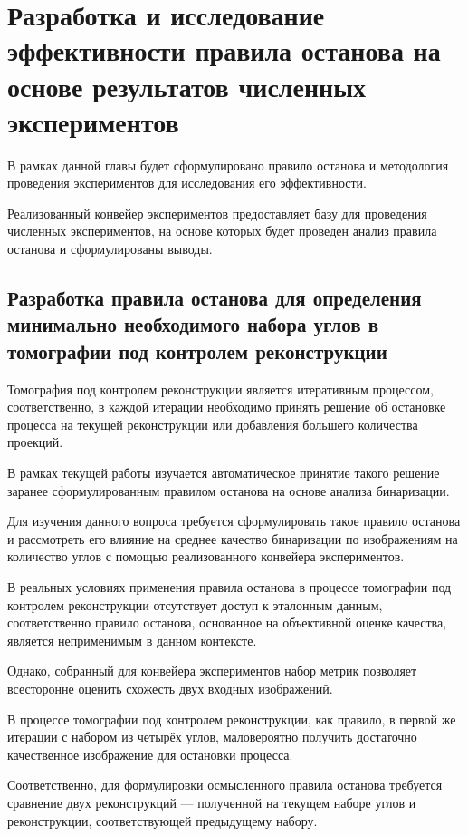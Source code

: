\section{Разработка и исследование эффективности правила останова на основе результатов численных экспериментов}

В рамках данной главы будет сформулировано правило останова и методология проведения экспериментов для исследования его эффективности.

Реализованный конвейер экспериментов предоставляет базу для проведения численных экспериментов, на основе которых будет проведен анализ правила останова и сформулированы выводы.

\subsection{Разработка правила останова для определения минимально необходимого набора углов в томографии под контролем реконструкции}

Томография под контролем реконструкции является итеративным процессом, соответственно, в каждой итерации необходимо принять решение об остановке процесса на текущей реконструкции или добавления большего количества проекций.

В рамках текущей работы изучается автоматическое принятие такого решение заранее сформулированным правилом останова на основе анализа бинаризации.

Для изучения данного вопроса требуется сформулировать такое правило останова и рассмотреть его влияние на среднее качество бинаризации по изображениям на количество углов с помощью реализованного конвейера экспериментов.

В реальных условиях применения правила останова в процессе томографии под контролем реконструкции отсутствует доступ к эталонным данным, соответственно правило останова, основанное на объективной оценке качества, является неприменимым в данном контексте.

Однако, собранный для конвейера экспериментов набор метрик позволяет всесторонне оценить схожесть двух входных изображений.

В процессе томографии под контролем реконструкции, как правило, в первой же итерации с набором из четырёх углов, маловероятно получить достаточно качественное изображение для остановки процесса. 

Соответственно, для формулировки осмысленного правила останова требуется сравнение двух реконструкций — полученной на текущем наборе углов и реконструкции, соответствующей предыдущему набору. 

